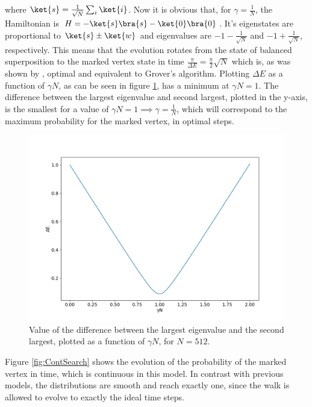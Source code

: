                 where $\ket{s} = \frac{1}{\sqrt{N}}\sum_i \ket{i}$. Now it is obvious that, for $\gamma = \frac{1}{N}$, the Hamiltonian is $H = -\ket{s}\bra{s} - \ket{0}\bra{0}$. It's eigenstates are proportional to $\ket{s}\pm\ket{w}$ and eigenvalues are $-1 - \frac{1}{\sqrt{N}}$ and $-1 + \frac{1}{\sqrt{N}}$, respectively. This means that the evolution rotates from the state of balanced superposition to the marked vertex state in time $\frac{\pi}{\Delta E} = \frac{\pi}{2}\sqrt{N}$ which is, as was shown by \cite{zalka1999}, optimal and equivalent to Grover's algorithm. Plotting $\Delta E$ as a function of $\gamma N$, as can be seen in figure \ref{fig:gamma512}, has a minimum at $\gamma N =1$. The difference between the largest eigenvalue and second largest, plotted in the y-axis, is the smallest for a value of $\gamma N = 1 \implies \gamma =\frac{1}{N}$, which will correspond to the maximum probability for the marked vertex, in optimal steps.
                
                \begin{figure}[h]
                    \centering \includegraphics[scale=0.40]{img/ContQuantumWalk/Search/gamma512.png}
                     \caption{Value of the difference between the largest eigenvalue and the second largest, plotted as a function of $\gamma N$, for $N=512$. }\label{fig:ContSearch}
                     \label{fig:gamma512}
                \end{figure}
                
                Figure \ref{fig:ContSearch} shows the evolution of the probability of the marked vertex in time, which is continuous in this model. In contrast with previous models, the distributions are smooth and reach exactly one, since the walk is allowed to evolve to exactly the ideal time steps.
                
